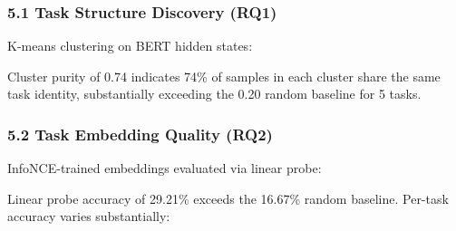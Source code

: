 
\subsubsection{5.1 Task Structure Discovery (RQ1)}

K-means clustering on BERT hidden states:

\begin{table}[htbp]
\centering
{}
\end{table}

Cluster purity of 0.74 indicates 74\% of samples in each cluster share the same task identity, substantially exceeding the 0.20 random baseline for 5 tasks.

\subsubsection{5.2 Task Embedding Quality (RQ2)}

InfoNCE-trained embeddings evaluated via linear probe:

\begin{table}[htbp]
\centering
{}
\end{table}

Linear probe accuracy of 29.21\% exceeds the 16.67\% random baseline. Per-task accuracy varies substantially:

\begin{table}[htbp]
\centering
{}
\end{table}


